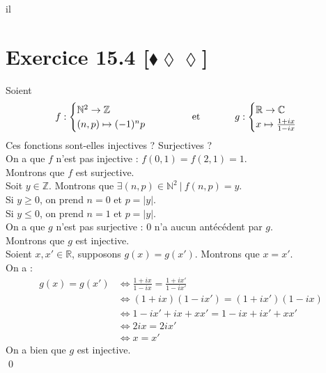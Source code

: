 il\documentclass[10pt]{article}
\begin{document}
\section*{Exercice 15.4 [$\blacklozenge\lozenge\lozenge$]}
\begin{tcolorbox}[enhanced, width=7.6in, center, size=fbox, fontupper=\large, drop shadow southwest]
    Soient
    \begin{equation*}
        f : \begin{cases}\mathbb{N}^2 \to \mathbb{Z} \\ (n,p) \mapsto (-1)^np \end{cases} \hspace{1.25cm} \text{et} \hspace{1.25cm} g : \begin{cases}\mathbb{R} \to \mathbb{C} \\ x\mapsto \frac{1+ix}{1-ix} \end{cases}
    \end{equation*}
    Ces fonctions sont-elles injectives ? Surjectives ?\\[0.2cm]
    On a que $f$ n'est pas injective : $f(0,1) = f(2,1) = 1$.\\
    Montrons que $f$ est surjective.\\
    Soit $y\in\mathbb{Z}$. Montrons que $\exists (n,p)\in\mathbb{N}^2 ~ | ~ f(n,p) = y$.\\
    Si $y \geq 0$, on prend $n = 0$ et $p = |y|$.\\
    Si $y \leq 0$, on prend $n = 1$ et $p = |y|$.\\[0.2cm]
    On a que $g$ n'est pas surjective : $0$ n'a aucun antécédent par $g$.\\
    Montrons que $g$ est injective.\\
    Soient $x,x' \in \mathbb{R}$, supposons $g(x) = g(x')$. Montrons que $x=x'$.\\
    On a :
    \begin{align*}
        g(x) = g(x') &\iff \frac{1+ix}{1-ix} = \frac{1+ix'}{1-ix'}\\
        &\iff (1+ix)(1-ix') = (1+ix')(1-ix)\\
        &\iff 1 - ix' + ix + xx' = 1 - ix + ix' + xx'\\
        &\iff 2ix = 2ix'\\
        &\iff x = x' 
    \end{align*}
    On a bien que $g$ est injective.\\
    \qed
\end{tcolorbox}
\end{document}
